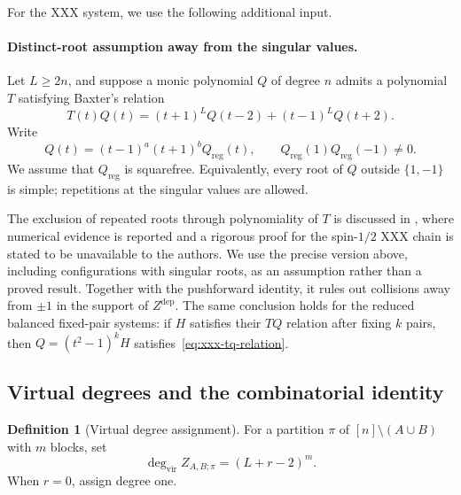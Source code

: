 \documentclass[11pt]{article}
\theoremstyle{definition}
\newtheorem{definition}[proposition]{Definition}
\begin{document}
For the XXX system, we use the following additional input.

\paragraph{Distinct-root assumption away from the singular values.}
Let $L\ge2n$, and suppose a monic polynomial $Q$ of degree $n$ admits
a polynomial $T$ satisfying Baxter's relation
\begin{equation}\label{eq:xxx-tq-relation}
 T(t)Q(t)=(t+1)^LQ(t-2)+(t-1)^LQ(t+2).
\end{equation}
Write
\[
 Q(t)=(t-1)^a(t+1)^bQ_{\mathrm{reg}}(t),
 \qquad Q_{\mathrm{reg}}(1)Q_{\mathrm{reg}}(-1)\ne0.
\]
We assume that $Q_{\mathrm{reg}}$ is squarefree. Equivalently, every
root of $Q$ outside $\{1,-1\}$ is simple; repetitions at the singular
values are allowed.

The exclusion of repeated roots through polynomiality of $T$ is
discussed in \cite[Introduction, eq.~(1.3) and footnote~2]{HJJ2024},
where numerical evidence is reported and a rigorous proof for the
spin-$1/2$ XXX chain is stated to be unavailable to the authors.
We use the precise version above, including configurations with
singular roots, as an assumption rather than a proved result.
Together with the pushforward identity, it rules out collisions away
from $\pm1$ in the support of $Z^{\mathrm{dep}}$. The same conclusion
holds for the reduced balanced fixed-pair systems: if $H$ satisfies
their $TQ$ relation after fixing $k$ pairs, then
$Q=(t^2-1)^kH$ satisfies~\eqref{eq:xxx-tq-relation}.

\subsection{Virtual degrees and the combinatorial identity}

\begin{definition}[Virtual degree assignment]
\label{def:virtual-degree}
For a partition $\pi$ of $[n]\setminus(A\cup B)$ with $m$ blocks, set
\begin{equation}\label{eq:virtual-partition-degree}
 \boxed{\deg_{\mathrm{vir}}Z_{A,B;\pi}=(L+r-2)^m.}
\end{equation}
When $r=0$, assign degree one.
\end{definition}
\end{document}
